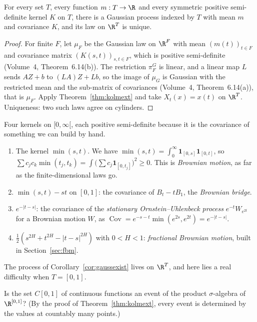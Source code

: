 \begin{corollary}\label{cor:gaussexist}
For every set $T$, every function $m:T\to\R$ and every symmetric positive semi-definite kernel $K$ on $T$, there is a Gaussian process indexed by $T$ with mean $m$ and covariance $K$, and its
law on $\R^T$ is unique.
\end{corollary}

\begin{proof}
For finite $F$, let $\mu_F$ be the Gaussian law on $\R^F$ with mean $(m(t))_{t\in F}$ and covariance matrix $(K(s,t))_{s,t\in F}$, which is positive semi-definite (Volume~4, Theorem~6.14(b)). The restriction
$\pi^G_F$ is linear, and a linear map $L$ sends $AZ+b$ to $(LA)Z+Lb$, so the image of $\mu_G$ is Gaussian with the restricted mean and the sub-matrix of covariances (Volume~4, Theorem~6.14(a)), that is $\mu_F$. Apply Theorem~\ref{thm:kolmext} and take $X_t(x)=x(t)$ on
$\R^T$. Uniqueness: two such laws agree on cylinders.
\end{proof}

\begin{example}\label{ex:kernels}
Four kernels on $[0,\infty[$, each positive semi-definite because it is the covariance of something we can build by hand.
\begin{enumerate}[label=(\alph*)]
\item The kernel $\min(s,t)$. We have $\min(s,t)=\int_0^\infty\mathbf 1_{[0,s]}\mathbf 1_{[0,t]}$, so $\sum c_jc_k\min(t_j,t_k)=\int\bigl(\sum c_j\mathbf 1_{[0,t_j]}\bigr)^2\ge0$. This is \emph{Brownian motion}, as far as the finite-dimensional laws go.
\item $\min(s,t)-st$ on $[0,1]$: the covariance of $B_t-tB_1$, the \emph{Brownian bridge}.
\item $e^{-|t-s|}$: the covariance of the \emph{stationary Ornstein--Uhlenbeck process} $e^{-t}W_{e^{2t}}$ for a Brownian motion $W$, as $\operatorname{Cov}=e^{-s-t}\min(e^{2s},e^{2t})=e^{-|t-s|}$.
\item $\frac12(s^{2H}+t^{2H}-|t-s|^{2H})$ with $0<H<1$: \emph{fractional Brownian motion}, built in Section~\ref{sec:fbm}.
\end{enumerate}
\end{example}

The process of Corollary~\ref{cor:gaussexist} lives on $\R^T$, and here lies a real difficulty when $T=[0,1]$.

\begin{think}
Is the set $C[0,1]$ of continuous functions an event of the product $\sigma$-algebra of $\R^{[0,1]}$? (By the proof of Theorem~\ref{thm:kolmext}, every event is determined by the values at countably
many points.)
\end{think}

